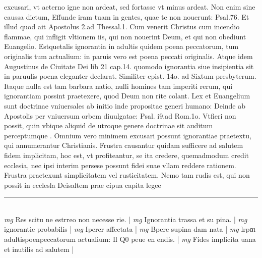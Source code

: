 \documentclass{article}
\begin{document}
\begin{pages}
excusari, vt aeterno igne non ardeat, sed fortasse vt minus ardeat. Non enim sine caussa dictum, Effunde iram tuam in gentes, quae te non nouerunt: Psal.76. Et illud quod ait Apostolus 2.ad Thessal.1. Cum venerit Christus cum incendio flammae, qui infligit vltionem iis, qui non nouerint Deum, et qui non obediunt Euangelio. Estquetalis ignorantia in adultis quidem poena peccatorum, tum originalis tum actualium: in paruis vero est poena peccati originalis. Atque  idem Augustinus de Ciuitate Dei lib 21 cap.14. quomodo ignorantia siue insipientia sit in paruulis poena eleganter declarat. Similiter epist. 14o. ad Sixtum presbyterum. Itaque  nulla est tam barbara natio, nulli homines tam imperiti rerum, qui ignorantiam possint praetexere, quod Deum non rite colant. Lex et Euangelium sunt doctrinae vniuersales ab initio inde propositae generi humano: Deinde ab Apostolis per vniuersum orbem diuulgatae: Psal. i9.ad Rom.1o. Vtfieri non possit, quin vbique  aliquid de utroque  genere doctrinae sit auditum perceptumque .  \pend\pstart Omnium vero minimem excusari possunt ignorantiae praetextu, qui annumerantur Christianis. Frustra causantur quidam sufficere ad salutem fidem implicitam, hoc est, vt profiteantur, se ita credere, quemadmodum credit ecclesia, nec ipsi interim persese possunt fidei suae vllam reddere rationem. Frustra praetexunt simplicitatem vel rusticitatem. Nemo tam rudis est, qui non possit in ecclesla Deisaltem prae cipua capita legee  \pend
\vspace{0.5cm}\noindent
\vspace{0.2cm}\rule{1cm}{0.2pt}\\ 
\hspace{0.2cm}\textit{mg}
\footnotesize Res scitu ne estrreo non necesse rie. 
\normalsize| 
\hspace{0.2cm}\textit{mg}
\footnotesize Ignorantia trassa et su pina. 
\normalsize| 
\hspace{0.2cm}\textit{mg}
\footnotesize ignorantie probabilis 
\normalsize| 
\hspace{0.2cm}\textit{mg}
\footnotesize Ipercr affectata
\normalsize| 
\hspace{0.2cm}\textit{mg}
\footnotesize Bpere supina dam nata
\normalsize| 
\hspace{0.2cm}\textit{mg}
\footnotesize lrpαι adultispoenpeccatorum actualium: Il Q0 peue en endis. 
\normalsize| 
\hspace{0.2cm}\textit{mg}
\footnotesize Fides implicita uana et inutilis ad salutem 
\normalsize| 

\end{pages}
\end{document}

